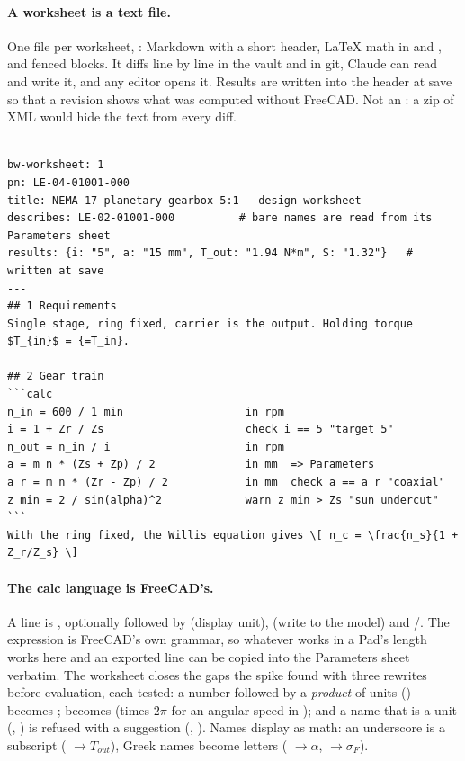 \paragraph{A worksheet is a text file.} One file per worksheet, : Markdown with a short header, LaTeX
math in \code{\$\ldots\$} and \code{\textbackslash[\ldots\textbackslash]}, and fenced  blocks. It diffs line by
line in the vault and in git, Claude can read and write it, and any editor opens it. Results are written into the
header at save so that a revision shows what was computed without FreeCAD. Not an : a zip of XML would
hide the text from every diff.
\begin{lstlisting}
---
bw-worksheet: 1
pn: LE-04-01001-000
title: NEMA 17 planetary gearbox 5:1 - design worksheet
describes: LE-02-01001-000          # bare names are read from its Parameters sheet
results: {i: "5", a: "15 mm", T_out: "1.94 N*m", S: "1.32"}   # written at save
---
## 1 Requirements
Single stage, ring fixed, carrier is the output. Holding torque $T_{in}$ = {=T_in}.

## 2 Gear train
```calc
n_in = 600 / 1 min                   in rpm
i = 1 + Zr / Zs                      check i == 5 "target 5"
n_out = n_in / i                     in rpm
a = m_n * (Zs + Zp) / 2              in mm  => Parameters
a_r = m_n * (Zr - Zp) / 2            in mm  check a == a_r "coaxial"
z_min = 2 / sin(alpha)^2             warn z_min > Zs "sun undercut"
```
With the ring fixed, the Willis equation gives \[ n_c = \frac{n_s}{1 + Z_r/Z_s} \]
\end{lstlisting}

\paragraph{The calc language is FreeCAD's.} A line is , optionally followed by
 (display unit),  (write to the model) and /. The expression is FreeCAD's own grammar, so whatever works in a Pad's length works here and an exported line
can be copied into the Parameters sheet verbatim. The worksheet closes the gaps the spike found with three rewrites
before evaluation, each tested: a number followed by a \emph{product} of units () becomes
;  becomes  (times $2\pi$ for an angular speed in );
and a name that is a unit (, ) is refused with a suggestion (, ).
Names display as math: an underscore is a subscript ( $\to T_{out}$), Greek names become letters
( $\to \alpha$,  $\to \sigma_F$).


